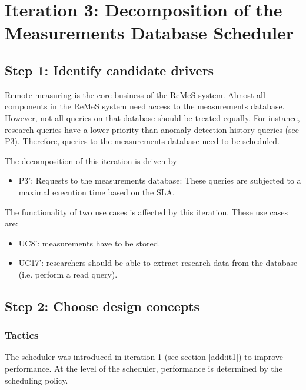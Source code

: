 \section{Iteration 3: Decomposition of the Measurements Database Scheduler}
\label{add:it3}

\subsection{Step 1: Identify candidate drivers}
\label{add:it3/drivers}

\npar Remote measuring is the core business of the ReMeS system. Almost all
components in the ReMeS system need access to the measurements database.
However, not all queries on that database should be treated equally. For
instance, research queries have a lower priority than anomaly detection history
queries (see P3). Therefore, queries to the measurements database need to be
scheduled.

\npar The decomposition of this iteration is driven by

\begin{itemize}
	\item P3': Requests to the measurements database: These queries are subjected
	to a maximal execution time based on the SLA. 
\end{itemize}

\npar The functionality of two use cases is affected by this iteration. These
use cases are:

\begin{itemize}
  \item UC8': measurements have to be stored.
  \item UC17': researchers should be able to extract research data from the
  database (i.e. perform a read query).
\end{itemize}

\subsection{Step 2: Choose design concepts}
\label{add:it3/concepts}

\subsubsection{Tactics}
\label{add:it3/tactics}

\npar The scheduler was introduced in iteration 1 (see section \ref{add:it1}) to
improve performance. At the level of the scheduler, performance is determined by
the scheduling policy. 

